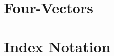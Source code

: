 \documentclass[11pt,fleqn]{book} %
\begin{document}
\chapter{Four-Vectors}

\chapter{Index Notation}
\end{document}
